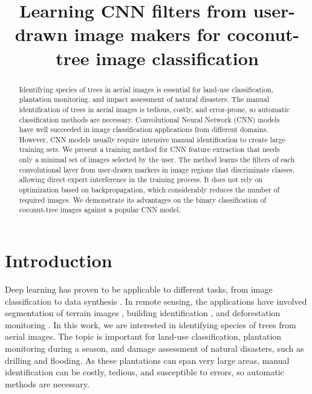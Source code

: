 \documentclass[a4paper,conference]{IEEEtran}
\begin{document}
\title{Learning CNN filters from user-drawn image makers for coconut-tree image classification}

\maketitle

\begin{abstract}
 Identifying species of trees in aerial images is essential for land-use classification, plantation monitoring, and impact assessment of natural disasters. The manual identification of trees in aerial images is tedious, costly, and error-prone, so automatic classification methods are necessary. Convolutional Neural Network (CNN) models have well succeeded in image classification applications from different domains. However, CNN models usually require intensive manual identification to create large training sets. We present a training method for CNN feature extraction that needs only a minimal set of images selected by the user. The method learns the filters of each convolutional layer from user-drawn markers in image regions that discriminate classes, allowing direct expert interference in the training process. It does not rely on optimization based on backpropagation, which considerably reduces the number of required images. We demonstrate its advantages on the binary classification of coconut-tree images against a popular CNN model.
\end{abstract}

\section{Introduction}
Deep learning has proven to be applicable to different tasks, from image classification to data synthesis \cite{goodfellow2016deep}. In remote sensing, the applications have involved segmentation of terrain images \cite{kemker2018algorithms, kampffmeyer2016semantic, hamaguchi2018effective}, building identification \cite{xu2018building, lu2018detecting, liu2018multilevel}, and deforestation monitoring \cite{bragilevsky2017deep}. In this work, we are interested in 
 identifying species of trees from aerial images. The topic is important for land-use classification, plantation monitoring during a season, and damage assessment of natural disasters, such as drilling and flooding. As these plantations can span very large areas, manual identification can be costly, tedious, and susceptible to errors, so automatic methods are necessary. 
\end{document}

